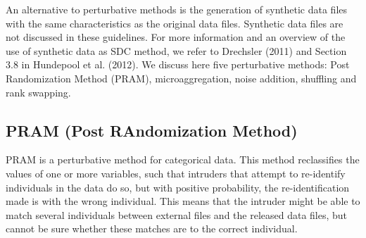 \documentclass[letterpaper,10pt,english]{sphinxmanual}
\begin{document}
An alternative to perturbative methods is the generation of synthetic
data files with the same characteristics as the original data files.
Synthetic data files are not discussed in these guidelines. For more
information and an overview of the use of synthetic data as SDC method,
we refer to Drechsler (2011) and Section 3.8 in Hundepool et al. (2012).
We discuss here five perturbative methods: Post Randomization Method
(PRAM), microaggregation, noise addition, shuffling and rank swapping.


\subsection{PRAM (Post RAndomization Method)}
\label{\detokenize{anon_methods:pram-post-randomization-method}}
PRAM is a perturbative method for categorical data. This method
reclassifies the values of one or more variables, such that intruders
that attempt to re-identify individuals in the data do so, but with
positive probability, the re-identification made is with the wrong
individual. This means that the intruder might be able to match several
individuals between external files and the released data files, but
cannot be sure whether these matches are to the correct individual.
\end{document}
